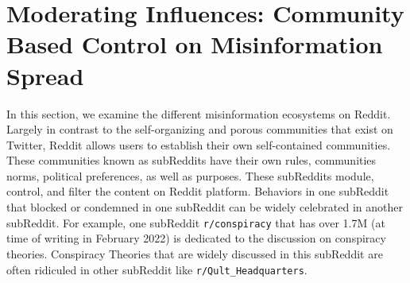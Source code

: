 \section{Moderating Influences: Community Based Control on Misinformation Spread}
In this section, we examine the different misinformation ecosystems on Reddit. Largely in contrast to the self-organizing and porous communities that exist on Twitter, Reddit allows users to  establish their own self-contained communities. These communities known as subReddits have their own rules, communities norms, political preferences, as well as purposes. These subReddits module, control, and filter the content on Reddit platform. Behaviors in one subReddit that blocked or condemned in one subReddit can be widely celebrated in another subReddit. For example, one subReddit \texttt{r/conspiracy} that has over 1.7M (at time of writing in February 2022)  is dedicated to the discussion on conspiracy theories. Conspiracy Theories that are widely discussed in this subReddit are often ridiculed in other subReddit like \texttt{r/Qult\_Headquarters}.
